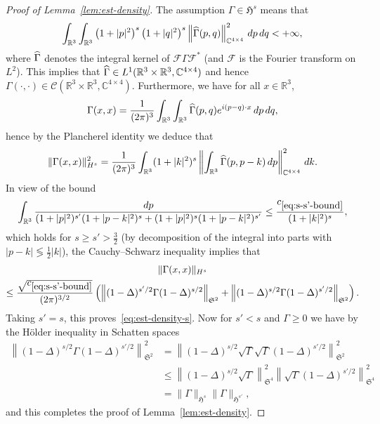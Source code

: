\documentclass[AHL,Unicode,longabstracts,published]{cedram}
\newcommand{\cC}{\mathcal{C}}
\newcommand{\cF}{\mathcal{F}}
\newcommand\R{\mathbb{R}}
\newcommand\C{\mathbb{C}}
\renewcommand\hat{\widehat}
\newcommand{\gS}{\mathfrak{S}}
\newcommand{\gH}{\mathfrak{H}}
\newcommand\ii{{\ensuremath {\infty}}}
\let\oldhat\hat
\renewcommand*{\hat}[1]{\mathchoice{\widehat{#1}}{\widehat{#1}}{\oldhat{#1}}{\oldhat{#1}}}
\begin{document}
\begin{proof}[Proof of Lemma~\ref{lem:est-density}]
The assumption $\Gamma\in \gH^s$ means that
\[
\int_{\R^3}\int_{\R^3}\left(1+|p|^2\right)^s\left(1+|q|^2\right)^s\left\|\hat{\Gamma}(p,q)\right\|^2_{\C^{4\times 4}}\,dp\,dq<+\ii,
\]
where $\hat{\Gamma}$ denotes the integral kernel of $\cF\Gamma\cF^*$ (and $\cF$ is the Fourier transform on $L^2$). This implies that $\hat{\Gamma}\in L^1(\R^3\times\R^3, \C^{4\times 4})$ and hence $\Gamma(\cdot,\cdot)\in \cC(\R^3\times\R^3, \C^{4\times 4})$. Furthermore, we have for all $x\in\R^3$,
\[
\Gamma(x,x)=\frac{1}{(2\pi)^3}\int_{\R^3}\int_{\R^3}\hat{\Gamma}(p,q)e^{i(p-q)\cdot x}\,dp\,dq,
\]
hence by the Plancherel identity we deduce that
\[
\|\Gamma(x,x)\|_{H^s}^2 = \frac{1}{(2\pi)^3}\int_{\R^3} (1+|k|^2)^s \left\|\int_{\R^3}\hat{\Gamma}(p,p-k)\,dp\right\|^2_{\C^{4\times 4}}\,dk.
\]
In view of the bound
\begin{equation}\label{eq:s-s'-bound}
\int_{\R^3}\frac{dp}{(1+|p|^2)^{s'}(1+|p-k|^2)^s + (1+|p|^2)^s(1+|p-k|^2)^{s'}}\leq
\frac{c_{\eqref{eq:s-s'-bound}}}{(1+|k|^2)^s},
\end{equation}
which holds for $s\geq s'>\tfrac32$ (by decomposition of the integral into parts with $|p-k|\lessgtr\tfrac12 |k|$), the Cauchy--Schwarz inequality implies that
\begin{multline}
\|\Gamma(x,x)\|_{H^s}\\
\leq \frac{\sqrt{c_{\eqref{eq:s-s'-bound}}}}{(2\pi)^{3/2}}\left(\left\|(1-\Delta)^{s'/2}\Gamma(1-\Delta)^{s/2}\right\|_{\gS^2} + \left\|(1-\Delta)^{s/2}\Gamma(1-\Delta)^{s'/2}\right\|_{\gS^2}\right).
\end{multline}
Taking $s'=s$, this proves~\eqref{eq:est-density-s}. Now for $s'<s$ and $\Gamma\geq 0$ we have by the H\"older inequality in Schatten spaces
\begin{equation}\label{eq:Gamma-mixed-bound}
\begin{split}
\left\|(1-\Delta)^{s/2}\Gamma(1-\Delta)^{s'/2}\right\|_{\gS^2}^2 &= \left\|(1-\Delta)^{s/2}\sqrt{\Gamma}\sqrt{\Gamma}(1-\Delta)^{s'/2}\right\|_{\gS^2}^2\\
&\leq \left\|(1-\Delta)^{s/2}\sqrt{\Gamma}\right\|_{\gS^4}^2\left\|\sqrt{\Gamma}(1-\Delta)^{s'/2}\right\|_{\gS^4}^2\\
&= \|\Gamma\|_{\gH^s}\|\Gamma\|_{\gH^{s'}},
\end{split}
\end{equation}
and this completes the proof of Lemma~\ref{lem:est-density}.
\end{proof}
\end{document}
